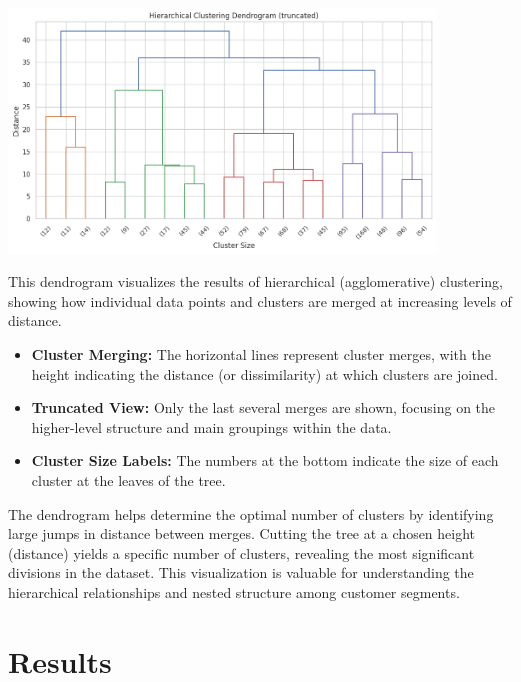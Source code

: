 \documentclass[a4paper]{article}
\begin{document}
\begin{multicols}{2}
\noindent
\begin{minipage}{\columnwidth}
\centering
\includegraphics[width=0.85\textwidth]{Hierarchical Clustering Dendrogram (truncated).png}
\label{fig:hierarchical_dendrogram}
\end{minipage}

This dendrogram visualizes the results of hierarchical (agglomerative) clustering, showing how individual data points and clusters are merged at increasing levels of distance.

\begin{itemize}
    \item \textbf{Cluster Merging:} The horizontal lines represent cluster merges, with the height indicating the distance (or dissimilarity) at which clusters are joined.
    \item \textbf{Truncated View:} Only the last several merges are shown, focusing on the higher-level structure and main groupings within the data.
    \item \textbf{Cluster Size Labels:} The numbers at the bottom indicate the size of each cluster at the leaves of the tree.
\end{itemize}

The dendrogram helps determine the optimal number of clusters by identifying large jumps in distance between merges. Cutting the tree at a chosen height (distance) yields a specific number of clusters, revealing the most significant divisions in the dataset. This visualization is valuable for understanding the hierarchical relationships and nested structure among customer segments.










\section{Results}


\end{multicols}
\end{document}
